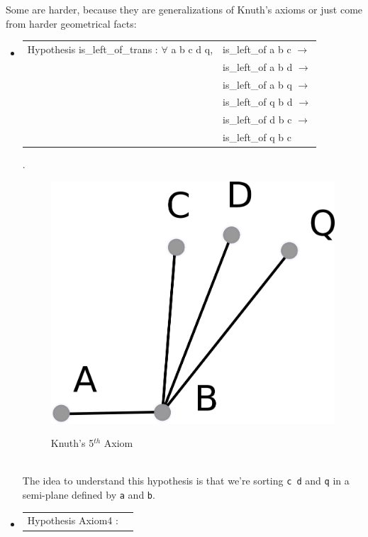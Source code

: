 \documentclass[a4paper,10pt]{article}
\begin{document}
Some are harder, because they are generalizations of Knuth's axioms or just come from harder geometrical facts:
\begin{itemize}
\item {\tt \begin{tabular}{ll} Hypothesis is\_left\_of\_trans : 
             $\forall$ a b c d q, &is\_left\_of a b c $\rightarrow$\\
                                           &is\_left\_of a b d $\rightarrow$\\
                                           &is\_left\_of a b q $\rightarrow$\\
                                           &is\_left\_of q b d $\rightarrow$\\
                                           &is\_left\_of d b c $\rightarrow$\\
                                           &is\_left\_of q b c 
           \end{tabular}}.
\\
\begin{figure}[h]
\centering
\caption{Knuth's 5$^{th}$ Axiom}
\includegraphics[scale=2]{Axiom5}\\
\end{figure}\\
The idea to understand this hypothesis is that we're sorting {\tt c d} and {\tt q} in a semi-plane defined by {\tt a} and {\tt b}.
\item {\tt \begin{tabular}{ll} Hypothesis Axiom4 : 

\end{tabular}}
\end{itemize}
\end{document}
